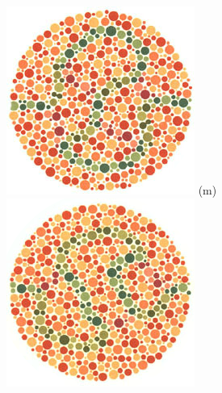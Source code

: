 \documentclass[	12pt, Times, openright, twoside, a4paper, english, brazil]{abntex2}
\begin{document}
\begin{apendicesenv}
\begin{figure}[!htb]
\endminipage\hfill
{}
\centering
{\includegraphics[width=\linewidth]{ishihara-fuga/plate34.png}}
(m)
\endminipage\hfill
{}
\centering
{\includegraphics[width=\linewidth]{ishihara-fuga/plate35.png}}

\end{figure}
\end{apendicesenv}
\end{document}
